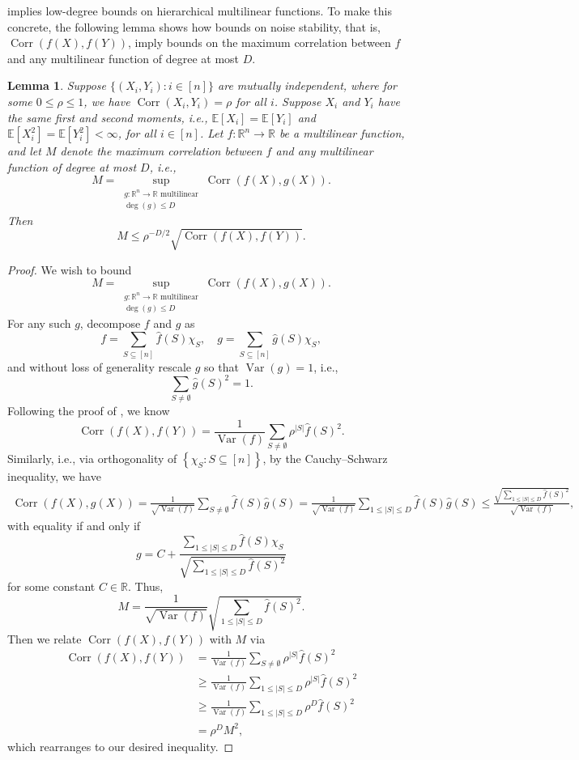 \documentclass[12pt,letterpaper]{amsart}
\def\E{\mathbb{E}}
\def\R{\mathbb{R}}
\def\deg{\operatorname{deg}}
\def\Var{\operatorname{Var}}
\def\Corr{\operatorname{Corr}}
\newcommand{\abs}[1]{\left\lvert#1\right\rvert}
\newcommand{\set}[1]{\left\{#1\right\}}
\newcommand{\1}[1]{1_{\left\{#1\right\}}}
\newtheorem{lemma}[theorem]{Lemma}
\theoremstyle{definition}
\theoremstyle{remark}
\begin{document}
 implies low-degree bounds on hierarchical multilinear functions.
To make this concrete, the following lemma shows how bounds on noise stability, that is, $\Corr(f(X),f(Y))$, imply bounds on the maximum correlation between $f$ and any multilinear function of degree at most $D$. 
\begin{lemma}\label{lemma:low_degree_multilinear}
    Suppose $\{(X_i,Y_i):i\in[n]\}$ are mutually independent, where for some $0\leq\rho\leq1$, we have $\Corr(X_i,Y_i)=\rho$ for all $i$.
    Suppose $X_i$ and $Y_i$ have the same first and second moments, i.e., $\E[X_i]=\E[Y_i]$ and $\E[X_i^2]=\E[Y_i^2]<\infty$, for all $i\in[n]$.
    Let $f:\R^n\to\R$ be a multilinear function, and let $M$ denote the maximum correlation between $f$ and any multilinear function of degree at most $D$, i.e.,
    \[ M = \sup_{\substack{g:\R^n\to\R\text{ multilinear}\\\deg(g)\leq D}} \Corr(f(X),g(X)). \]
    Then
    \[ M \leq \rho^{-D/2}\sqrt{\Corr(f(X),f(Y))}. \]
\end{lemma}
\begin{proof}
    We wish to bound
    \[ M = \sup_{\substack{g:\R^n\to\R\text{ multilinear}\\ \deg(g)\leq D}}\Corr(f(X),g(X)). \]
    For any such $g$, decompose $f$ and $g$ as
    \[ f = \sum_{S\subseteq[n]}\widehat f(S)\chi_S, \quad g = \sum_{S\subseteq[n]}\widehat g(S)\chi_S, \]
    and without loss of generality rescale $g$ so that $\Var(g)=1$, i.e.,
    \[ \sum_{S\neq\emptyset}\widehat g(S)^2 = 1. \]
    Following the proof of , we know
    \[ \Corr(f(X),f(Y)) = \frac{1}{\Var(f)}\sum_{S\neq\emptyset}\rho^{\abs{S}}\widehat f(S)^2. \]
    Similarly, i.e., via orthogonality of $\set{\chi_S:S\subseteq[n]}$, by the Cauchy--Schwarz inequality, we have
    \begin{align*}
        \Corr(f(X),g(X))
        = \frac{1}{\sqrt{\Var(f)}}\sum_{S\neq\emptyset}\widehat f(S)\widehat g(S)
        = \frac{1}{\sqrt{\Var(f)}}\sum_{1 \leq \abs{S}\leq D}\widehat f(S)\widehat g(S)
        \leq \frac{\sqrt{\displaystyle\sum_{1\leq\abs{S}\leq D}\widehat f(S)^2}}{\sqrt{\Var(f)}},
    \end{align*}
    with equality if and only if
    \[ g = C+\frac{\displaystyle\sum_{1\leq\abs{S}\leq D}\widehat f(S)\chi_S}{\sqrt{\displaystyle\sum_{1\leq\abs{S}\leq D}\widehat f(S)^2}}\]
    for some constant $C\in\R$.
    Thus,
    \[ M = \frac{1}{\sqrt{\Var(f)}}\sqrt{\sum_{1\leq\abs{S}\leq D}\widehat f(S)^2}. \]
    Then we relate $\Corr(f(X),f(Y))$ with $M$ via
    \begin{align*}
        \Corr(f(X),f(Y))
        &= \frac{1}{\Var(f)}\sum_{S\neq\emptyset}\rho^{\abs{S}}\widehat f(S)^2
        \\ &\geq \frac{1}{\Var(f)}\sum_{1\leq\abs{S}\leq D}\rho^{\abs{S}}\widehat f(S)^2
        \\ &\geq \frac{1}{\Var(f)}\sum_{1\leq\abs{S}\leq D}\rho^D\widehat f(S)^2
        \\ &= \rho^D M^2,
    \end{align*}
    which rearranges to our desired inequality.
\end{proof}
\end{document}
